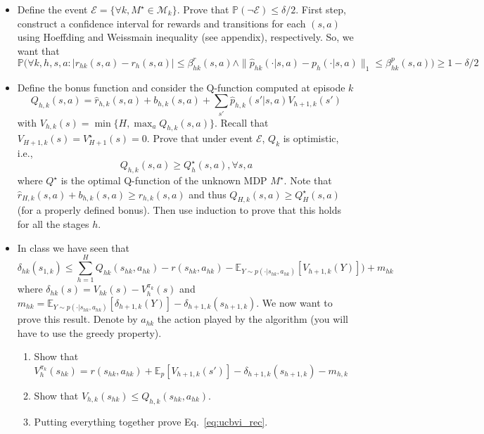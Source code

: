 \documentclass[a4paper]{article}
\newcommand{\wh}[1]{\widehat{#1}}
\begin{document}
\begin{itemize}
    \item Define the event $\mathcal{E} = \{\forall k, M^\star \in \mathcal{M}_k\}$. Prove that $\mathbb{P}(\neg\mathcal{E}) \leq \delta/2$. First step, construct a confidence interval for rewards and transitions for each $(s,a)$ using Hoeffding and Weissmain inequality (see appendix), respectively. So, we want that
          \[
              \mathbb{P}\Big(\forall k,h,s,a : |r_{hk}(s,a) - r_h(s,a)| \leq \beta_{hk}^r(s,a) \wedge \|\wh{p}_{hk}(\cdot|s,a) - p_{h}(\cdot|s,a)\|_1\leq \beta_{hk}^p(s,a)\Big) \geq 1-\delta/2
          \]

    \item Define the bonus function and consider the Q-function computed at episode $k$
          \[
              Q_{h,k}(s,a) = \wh{r}_{h,k}(s,a) + b_{h,k}(s,a) + \sum_{s'} \wh{p}_{h,k}(s'|s,a) V_{h+1,k}(s')
          \]
          with $V_{h,k}(s) = \min\{H, \max_a Q_{h,k}(s,a)\}$. Recall that $V_{H+1,k}(s) = V_{H+1}^\star(s) = 0$.
          Prove that under event $\mathcal{E}$, $Q_k$ is optimistic, i.e.,
          \[
              Q_{h,k}(s,a) \geq Q^{\star}_h(s,a), \forall s,a
          \]
          where $Q^\star$ is the optimal Q-function of the unknown MDP $M^\star$.
          Note that $\wh{r}_{H,k}(s,a) + b_{h,k}(s,a) \geq r_{h,k}(s,a)$ and thus $Q_{H,k}(s,a) \geq Q^\star_H(s,a)$ (for a properly defined bonus). Then use induction to prove that this holds for all the stages $h$.

    \item In class we have seen that
          \begin{equation}
              \label{eq:ucbvi_rec}
              \delta_{hk}(s_{1,k}) \leq \sum_{h=1}^H Q_{hk}(s_{hk},a_{hk}) - r(s_{hk},a_{hk}) - \mathbb{E}_{Y\sim p(\cdot|s_{hk},a_{hk})}[V_{h+1,k}(Y)]) + m_{hk}
          \end{equation}
          where $\delta_{hk}(s)=V_{hk}(s) - V_h^{\pi_k}(s)$ and $m_{hk} = \mathbb{E}_{Y\sim p(\cdot|s_{hk},a_{hk})}[\delta_{h+1,k}(Y)] - \delta_{h+1,k}(s_{h+1,k})$.
          We now want to prove this result. Denote by $a_{hk}$ the action played by the algorithm (you will have to use the greedy property).
          \begin{enumerate}
              \item Show that $V^{\pi_{k}}_h(s_{hk}) = r(s_{hk},a_{hk}) + \mathbb{E}_{p}[V_{h+1,k}(s')] - \delta_{h+1,k}(s_{h+1,k}) - m_{h,k}$
              \item Show that $V_{h,k}(s_{hk}) \leq Q_{h,k}(s_{hk},a_{hk})$.
              \item Putting everything together prove Eq.~\ref{eq:ucbvi_rec}.
          \end{enumerate}


\end{itemize}
\end{document}
